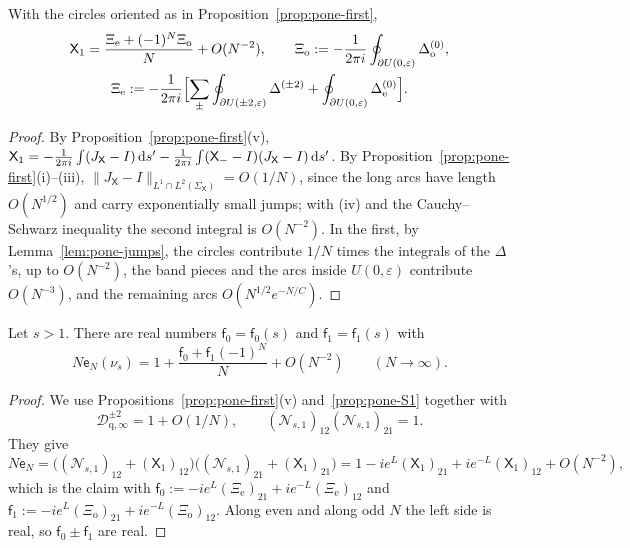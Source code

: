 \begin{proposition}\label{prop:pone-S1}
With the circles oriented as in Proposition~\textup{\ref{prop:pone-first}},
\begin{gather*}
  \mathsf X_1=\frac{\Xi_{\mathrm e}+(-1)^N\Xi_{\mathrm o}}N+O(N^{-2}),\qquad
  \Xi_{\mathrm o}:=-\frac1{2\pi i}\oint_{\partial U(0,\varepsilon)}\Delta^{(0)}_{\mathrm o},\\
  \Xi_{\mathrm e}:=-\frac1{2\pi i}\Bigl[\sum_\pm\oint_{\partial U(\pm2,\varepsilon)}\Delta^{(\pm2)}+\oint_{\partial U(0,\varepsilon)}\Delta^{(0)}_{\mathrm e}\Bigr].
\end{gather*}
\end{proposition}

\begin{proof}
By Proposition~\ref{prop:pone-first}(v),
$\mathsf X_1=-\frac1{2\pi i}\int(J_{\mathsf X}-I)\,\mathrm{d} s'-\frac1{2\pi i}\int(\mathsf X_--I)(J_{\mathsf X}-I)\,\mathrm{d} s'$. By
Proposition~\ref{prop:pone-first}(i)--(iii), $\|J_{\mathsf X}-I\|_{L^1\cap L^2(\Sigma_{\mathsf X})}=O(1/N)$, since the long arcs
have length $O(N^{1/2})$ and carry exponentially small jumps; with (iv) and the Cauchy--Schwarz inequality the second
integral is $O(N^{-2})$. In the first, by Lemma~\ref{lem:pone-jumps}, the circles contribute $1/N$ times the integrals of
the $\Delta$'s, up to $O(N^{-2})$, the band pieces and the arcs inside $U(0,\varepsilon)$ contribute $O(N^{-3})$, and the
remaining arcs $O(N^{1/2}e^{-N/C})$.
\end{proof}

\begin{theorem}\label{thm:pone-chain}
Let $s>1$. There are real numbers $\mathsf f_0=\mathsf f_0(s)$ and $\mathsf f_1=\mathsf f_1(s)$ with
\[
  N\mathsf e_N(\nu_s)=1+\frac{\mathsf f_0+\mathsf f_1(-1)^N}N+O(N^{-2})\qquad(N\to\infty).
\]
\end{theorem}

\begin{proof}
We use Propositions~\ref{prop:pone-first}(v) and~\ref{prop:pone-S1} together with
\[
  \mathcal D_{\mathrm q,\infty}^{\pm2}=1+O(1/N),\qquad(\mathcal N_{s,1})_{12}(\mathcal N_{s,1})_{21}=1.
\]
They give
\[
  N\mathsf e_N=\bigl((\mathcal N_{s,1})_{12}+(\mathsf X_1)_{12}\bigr)\bigl((\mathcal N_{s,1})_{21}+(\mathsf X_1)_{21}\bigr)
  =1-ie^L(\mathsf X_1)_{21}+ie^{-L}(\mathsf X_1)_{12}+O(N^{-2}),
\]
which is the claim with $\mathsf f_0:=-ie^L(\Xi_{\mathrm e})_{21}+ie^{-L}(\Xi_{\mathrm e})_{12}$ and
$\mathsf f_1:=-ie^L(\Xi_{\mathrm o})_{21}+ie^{-L}(\Xi_{\mathrm o})_{12}$. Along even and along odd $N$ the left side is real, so
$\mathsf f_0\pm\mathsf f_1$ are real.
\end{proof}

